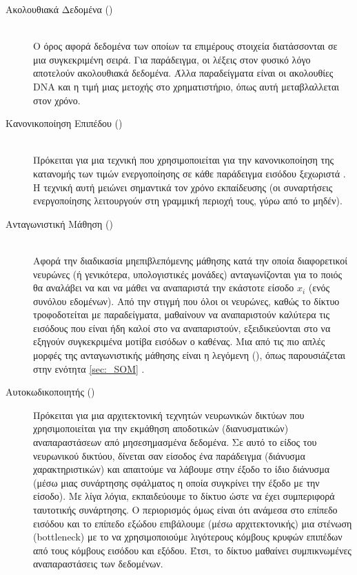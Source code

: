 \begin{description}
    \item[Ακολουθιακά Δεδομένα ()] \hfill \\ Ο όρος αφορά δεδομένα των οποίων τα επιμέρους στοιχεία διατάσσονται σε μια συγκεκριμένη σειρά. Για παράδειγμα, οι λέξεις στον φυσικό λόγο αποτελούν ακολουθιακά δεδομένα. Άλλα παραδείγματα είναι οι ακολουθίες DNA και η τιμή μιας μετοχής στο χρηματιστήριο, όπως αυτή μεταβλαλλεται στον χρόνο.
    \item[Κανονικοποίηση Επιπέδου ()] \hfill \\ Πρόκειται για μια τεχνική που χρησιμοποιείται για την κανονικοποίηση της κατανομής των τιμών ενεργοποίησης σε κάθε παράδειγμα εισόδου ξεχωριστά \cite{ba2016layer_normalization}. Η τεχνική αυτή μειώνει σημαντικά τον χρόνο εκπαίδευσης (οι συναρτήσεις ενεργοποίησης λειτουργούν στη γραμμική περιοχή τους, γύρω από το μηδέν).
    \item[Ανταγωνιστική Μάθηση ()] \hfill \\ Αφορά την διαδικασία μη\textendash επιβλεπόμενης μάθησης κατά την οποία διαφορετικοί νευρώνες (ή γενικότερα, υπολογιστικές μονάδες) ανταγωνίζονται για το ποιός θα αναλάβει να  και να μάθει να αναπαριστά την εκάστοτε είσοδο $x_i$ (ενός συνόλου εδομένων). Από την στιγμή που όλοι οι νευρώνες, καθώς το δίκτυο τροφοδοτείται με παραδείγματα, μαθαίνουν να αναπαριστούν καλύτερα τις εισόδους που είναι ήδη καλοί στο να αναπαριστούν, εξειδικεύονται στο να εξηγούν συγκεκριμένα μοτίβα εισόδων ο καθένας. Μια από τις πιο απλές μορφές της ανταγωνιστικής μάθησης είναι η λεγόμενη  (), όπως παρουσιάζεται στην ενότητα \ref{sec:_SOM} \cite{sammut2011encyclopedia}.
    \item[Αυτοκωδικοποιητής ()] Πρόκειται για μια αρχιτεκτονική τεχνητών νευρωνικών δικτύων που χρησιμοποιείται για την εκμάθηση αποδοτικών (διανυσματικών) αναπαραστάσεων από μη\textendash σεσημασμένα δεδομένα. Σε αυτό το είδος του νευρωνικού δικτύου, δίνεται σαν είσοδος ένα παράδειγμα (διάνυσμα χαρακτηριστικών) και απαιτούμε να λάβουμε στην έξοδο το ίδιο διάνυσμα (μέσω μιας συνάρτησης σφάλματος η οποία συγκρίνει την έξοδο με την είσοδο). Με λίγα λόγια, εκπαιδεύουμε το δίκτυο ώστε να έχει συμπεριφορά ταυτοτικής συνάρτησης. Ο περιορισμός όμως είναι ότι ανάμεσα στο επίπεδο εισόδου και το επίπεδο εξώδου επιβάλουμε (μέσω αρχιτεκτονικής) μια στένωση (bottleneck) με το να χρησιμοποιούμε λιγότερους κόμβους κρυφών επιπέδων από τους κόμβους εισόδου και εξόδου. Έτσι, το δίκτυο μαθαίνει συμπικνωμένες αναπαραστάσεις των δεδομένων. 
 \end{description}